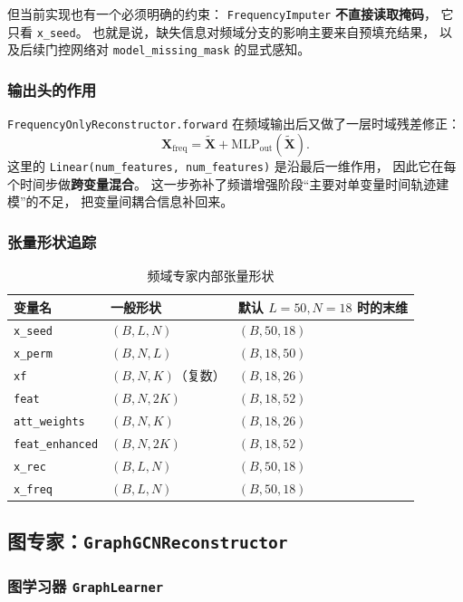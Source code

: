\documentclass[UTF8,11pt,a4paper]{ctexart}
\begin{document}
但当前实现也有一个必须明确的约束：
\texttt{FrequencyImputer} \textbf{不直接读取掩码}，
它只看 \texttt{x\_seed}。
也就是说，缺失信息对频域分支的影响主要来自预填充结果，
以及后续门控网络对 \texttt{model\_missing\_mask} 的显式感知。

\subsubsection{输出头的作用}

\texttt{FrequencyOnlyReconstructor.forward} 在频域输出后又做了一层时域残差修正：
\[
\bm{X}_{\mathrm{freq}}
=
\tilde{\bm{X}} + \mathrm{MLP}_{\mathrm{out}}(\tilde{\bm{X}}).
\]
这里的 \texttt{Linear(num\_features, num\_features)} 是沿最后一维作用，
因此它在每个时间步做\textbf{跨变量混合}。
这一步弥补了频谱增强阶段“主要对单变量时间轨迹建模”的不足，
把变量间耦合信息补回来。

\subsubsection{张量形状追踪}

\begin{table}[H]
\centering
\caption{频域专家内部张量形状}
\begin{tabular}{@{}lll@{}}
\toprule
变量名 & 一般形状 & 默认 $L{=}50,N{=}18$ 时的末维 \\
\midrule
\texttt{x\_seed} & $(B,L,N)$ & $(B,50,18)$ \\
\texttt{x\_perm} & $(B,N,L)$ & $(B,18,50)$ \\
\texttt{xf} & $(B,N,K)$（复数） & $(B,18,26)$ \\
\texttt{feat} & $(B,N,2K)$ & $(B,18,52)$ \\
\texttt{att\_weights} & $(B,N,K)$ & $(B,18,26)$ \\
\texttt{feat\_enhanced} & $(B,N,2K)$ & $(B,18,52)$ \\
\texttt{x\_rec} & $(B,L,N)$ & $(B,50,18)$ \\
\texttt{x\_freq} & $(B,L,N)$ & $(B,50,18)$ \\
\bottomrule
\end{tabular}
\end{table}

\subsection{图专家：\texttt{GraphGCNReconstructor}}

\subsubsection{图学习器 \texttt{GraphLearner}}
\end{document}
